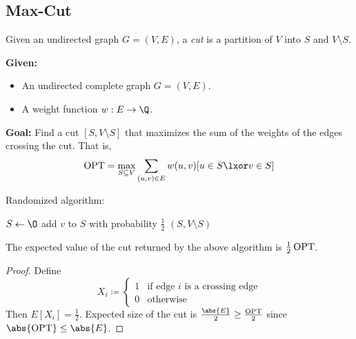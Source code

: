 \subsection{Max-Cut} \label{sec:max-cut}
\vspace{1em}
\begin{definition}[Cut] \label{def:max-cut:cut}
    Given an undirected graph $G = (V, E)$, a \emph{cut} is a partition of
    $V$ into $S$ and $V \setminus S$.
\end{definition}

\begin{problem}
    \textbf{Given:} \begin{itemize}
        \item An undirected complete graph $G = (V, E)$.
        \item A weight function $w : E \to \Q$.
    \end{itemize}
    \textbf{Goal:} Find a cut $[S, V \setminus S]$ that maximizes the sum of
    the weights of the edges crossing the cut.
    That is, \[
        \OPT = \max_{S \subseteq V} \sum_{(u, v) \in E} w(u, v)
            [u \in S \lxor v \in S]
    \]
\end{problem}

Randomized algorithm:
\begin{algo}
        \State $S \gets \O$
            \State add $v$ to $S$ with probability $\frac{1}{2}$
        \EndFor
        \State \Return $(S, V \setminus S)$
    \EndFn
\end{algo}
\begin{proposition}
    The expected value of the cut returned by the above algorithm is
    $\frac{1}{2} \operatorname{OPT}$.
\end{proposition}
\begin{proof}
    Define \[
        X_i \coloneq \begin{cases}
            1 & \text{if edge $i$ is a crossing edge} \\
            0 & \text{otherwise}
        \end{cases}
    \] Then $E[X_i] = \frac12$.
    Expected size of the cut is $\frac{\abs{E}}{2} \ge \frac{\OPT}{2}$ since
    $\abs{\OPT} \le \abs{E}$.
\end{proof}
